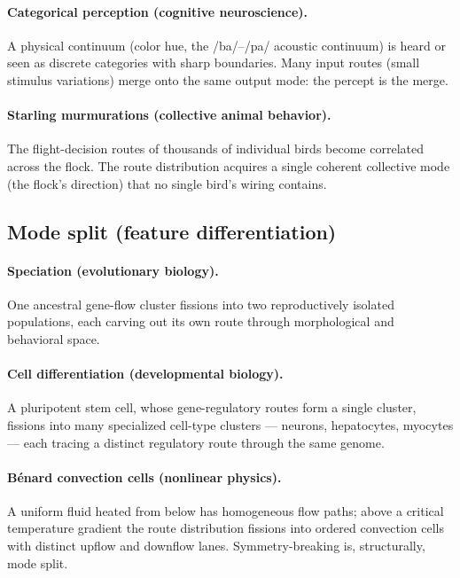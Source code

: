 \documentclass[11pt,a4paper]{article}
\begin{document}
\paragraph{Categorical perception (cognitive neuroscience).}
A physical continuum (color hue, the /ba/--/pa/ acoustic
continuum) is heard or seen as discrete categories with sharp
boundaries. Many input routes (small stimulus variations) merge
onto the same output mode: the percept is the merge.

\paragraph{Starling murmurations (collective animal behavior).}
The flight-decision routes of thousands of individual birds become
correlated across the flock. The route distribution acquires a
single coherent collective mode (the flock's direction) that no
single bird's wiring contains.

\subsection{Mode split (feature differentiation)}

\paragraph{Speciation (evolutionary biology).}
One ancestral gene-flow cluster fissions into two reproductively
isolated populations, each carving out its own route through
morphological and behavioral space.

\paragraph{Cell differentiation (developmental biology).}
A pluripotent stem cell, whose gene-regulatory routes form a
single cluster, fissions into many specialized cell-type
clusters --- neurons, hepatocytes, myocytes --- each tracing a
distinct regulatory route through the same genome.

\paragraph{B\'enard convection cells (nonlinear physics).}
A uniform fluid heated from below has homogeneous flow paths;
above a critical temperature gradient the route distribution
fissions into ordered convection cells with distinct upflow and
downflow lanes. Symmetry-breaking is, structurally, mode split.
\end{document}
